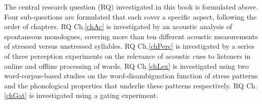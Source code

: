 The central research question (RQ) investigated in this book is formulated above. Four sub-questions are formulated that each cover a specific aspect, following the order of chapters. RQ Ch.\ref{chAc} is investigated by an acoustic analysis of spontaneous monologues, covering more than ten different acoustic measurements of stressed versus unstressed syllables. RQ Ch.\ref{chPerc} is investigated by a series of three perception experiments on the relevance of acoustic cues to listeners in online and offline processing of words. RQ Ch.\ref{chLex} is investigated using two word-corpus-based studies on the word-disambiguation function of stress patterns and the phonological properties that underlie these patterns respectively. RQ Ch.\ref{chGat} is investigated using a gating experiment. \par
